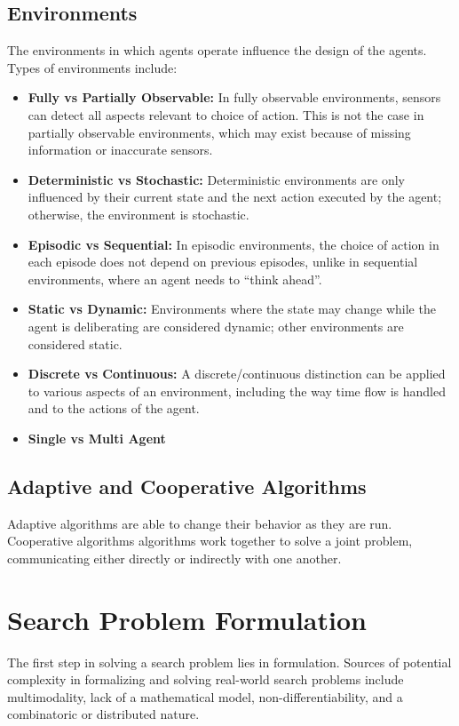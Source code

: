 \documentclass[12pt,titlepage]{article}
\begin{document}
    \subsection{Environments}
      The environments in which agents operate influence the design of the agents. Types of environments include:
      \begin{itemize}
        \item \textbf{Fully vs Partially Observable:} In fully observable environments, sensors can detect all aspects
        relevant to choice of action. This is not the case in partially observable environments, which may exist because
        of missing information or inaccurate sensors.
        \item \textbf{Deterministic vs Stochastic:} Deterministic environments are only influenced by their current
        state and the next action executed by the agent; otherwise, the environment is stochastic.
        \item \textbf{Episodic vs Sequential:} In episodic environments, the choice of action in each episode does not
        depend on previous episodes, unlike in sequential environments, where an agent needs to ``think ahead''.
        \item \textbf{Static vs Dynamic:} Environments where the state may change while the agent is deliberating are
        considered dynamic; other environments are considered static.
        \item \textbf{Discrete vs Continuous:} A discrete/continuous distinction can be applied to various aspects of
        an environment, including the way time flow is handled and to the actions of the agent.
        \item \textbf{Single vs Multi Agent}
      \end{itemize}

    \subsection{Adaptive and Cooperative Algorithms}
      Adaptive algorithms are able to change their behavior as they are run. Cooperative algorithms algorithms work
      together to solve a joint problem, communicating either directly or indirectly with one another.

  \newpage

  \section{Search Problem Formulation}
    The first step in solving a search problem lies in formulation. Sources of potential complexity in formalizing and
    solving real-world search problems include multimodality, lack of a mathematical model, non-differentiability, and
    a combinatoric or distributed nature.
\end{document}
